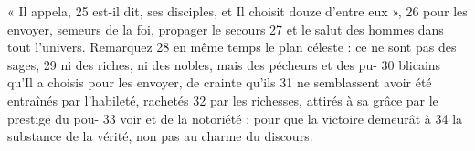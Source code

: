 « Il appela,	 
25	 	est-il dit, ses disciples, et Il choisit douze d'entre eux »,	 
26	 	pour les envoyer, semeurs de la foi, propager le secours	 
27	 	et le salut des hommes dans tout l'univers. Remarquez	 
28	 	en même temps le plan céleste : ce ne sont pas des sages,	 
29	 	ni des riches, ni des nobles, mais des pécheurs et des pu-	 
30	 	blicains qu'Il a choisis pour les envoyer, de crainte qu'ils	 
31	 	ne semblassent avoir été entraînés par l'habileté, rachetés	 
32	 	par les richesses, attirés à sa grâce par le prestige du pou-	 
33	 	voir et de la notoriété ; pour que la victoire demeurât à	 
34	 	la substance de la vérité, non pas au charme du discours.
